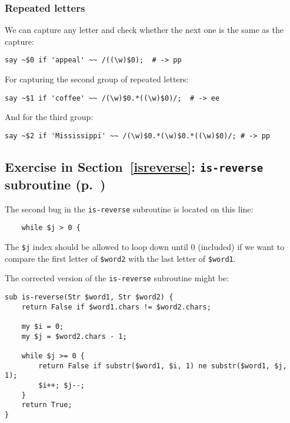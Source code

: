 \subsubsection{Repeated letters}

We can capture any letter and check whether the next one is 
the same as the capture:

\begin{verbatim}
say ~$0 if 'appeal' ~~ /((\w)$0);  # -> pp
\end{verbatim}

For capturing the second group of repeated letters:

\begin{verbatim}
say ~$1 if 'coffee' ~~ /(\w)$0.*((\w)$0)/;  # -> ee
\end{verbatim}

And for the third group:

\begin{verbatim}
say ~$2 if 'Mississippi' ~~ /(\w)$0.*(\w)$0.*((\w)$0)/; # -> pp
\end{verbatim}


\subsection{Exercise in Section~\ref{isreverse}: {\tt is-reverse} subroutine (p.~\pageref{isreverse})}
\label{sol_isreverse}

The second bug in the {\tt is-reverse} subroutine is located 
on this line:

\begin{verbatim}
    while $j > 0 {
\end{verbatim}
%

The {\tt \$j} index should be allowed to loop down until 0 
(included) if we want to compare the first letter of 
{\tt \$word2} with the last letter of {\tt \$word1}.

The corrected version of the  {\tt is-reverse} subroutine 
might be:

\begin{verbatim}
sub is-reverse(Str $word1, Str $word2) {
    return False if $word1.chars != $word2.chars;
    
    my $i = 0;
    my $j = $word2.chars - 1;

    while $j >= 0 {
        return False if substr($word1, $i, 1) ne substr($word1, $j, 1);
        $i++; $j--;
    }
    return True;
}
\end{verbatim}
%

